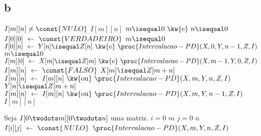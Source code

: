 \subsection{b}

\def\And{\mbox{ \kw{e} }}
\def\Or{\mbox{ \kw{ou} }}

\begin{codebox}
    \li {} $I[m][n] \ne \const{NULO}$
        \Then
    \li     {} $I[m][n]$
        \End
    \li
    \li {} $m \isequal 0 \And n \isequal 0$
        \Then
    \li     $I[0][0] \gets \const{VERDADEIRO}$
        \End
    \li {} $m \isequal 0$
        \Then
    \li     $I[0][n] \gets Y[n] \isequal Z[n] \And \proc{Intercalacao-PD}(X, 0, Y, n-1, Z, I)$
        \End
    \li {} $m \isequal 0$
        \Then
    \li     $I[m][0] \gets X[m] \isequal Z[m] \And \proc{Intercalacao-PD}(X, m-1, Y, 0, Z, I)$
        \End
    \li {}
        \Then
    \li     $I[m][n] \gets \const{FALSO}$
    \li     {} $X[m] \isequal Z[m + n]$
            \Then
    \li         $I[m][n] \gets I[m][n] \Or \proc{Intercalacao-PD}(X, m, Y, n, Z, I)$
            \End
    \li     {} $Y[n] \isequal Z[m + n]$
            \Then
    \li         $I[m][n] \gets I[m][n] \Or \proc{Intercalacao-PD}(X, m, Y, n-1, Z, I)$
            \End
        \End
    \li
    \li {} $I[m][n]$
\end{codebox}

\begin{codebox}
    \li Seja $I[0 \twodots m][0 \twodots n]$ uma matriz.
    \li
    \li {} $i = 0$  $m$
        \Do
    \li     {} $j = 0$  $n$
            \Do
    \li         $I[i][j] \gets \const{NULO}$
            \End
        \End
    \li
    \li {} $\proc{Intercalacao-PD}(X, m, Y, n, Z, I)$
\end{codebox}
